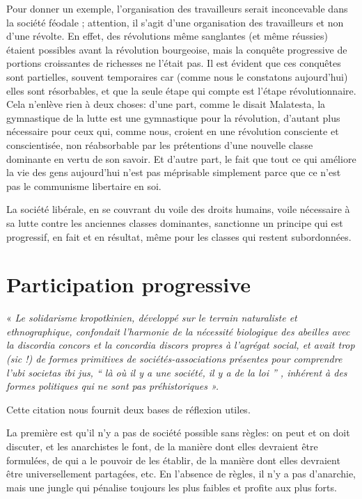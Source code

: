 Pour donner un exemple, l'organisation des travailleurs serait inconcevable dans la société féodale ; attention, il s'agit d'une organisation des travailleurs et non d'une révolte. En effet, des révolutions même sanglantes (et même réussies) étaient possibles avant la révolution bourgeoise, mais la conquête progressive de portions croissantes de richesses ne l'était pas. Il est évident que ces conquêtes sont partielles, souvent temporaires car (comme nous le constatons aujourd'hui) elles sont résorbables, et que la seule étape qui compte est l'étape révolutionnaire. Cela n'enlève rien à deux choses: d'une part, comme le disait Malatesta, la gymnastique de la lutte est une gymnastique pour la révolution, d'autant plus nécessaire pour ceux qui, comme nous, croient en une révolution consciente et conscientisée, non réabsorbable par les prétentions d'une nouvelle classe dominante en vertu de son savoir. Et d'autre part, le fait que tout ce qui améliore la vie des gens aujourd'hui n'est pas méprisable simplement parce que ce n'est pas le communisme libertaire en soi.

La société libérale, en se couvrant du voile des droits humains, voile nécessaire à sa lutte contre les anciennes classes dominantes, sanctionne un principe qui est progressif, en fait et en résultat, même pour les classes qui restent subordonnées.

\section{Participation progressive}

« \emph{Le solidarisme kropotkinien, développé sur le terrain naturaliste et ethnographique, confondait l'harmonie de la nécessité biologique des abeilles avec la discordia concors et la concordia discors propres à l'agrégat social, et avait trop (sic !) de formes primitives de sociétés-associations présentes pour comprendre l'ubi societas ibi jus, “ là où il y a une société, il y a de la loi ” , inhérent à des formes politiques qui ne sont pas préhistoriques ».}

Cette citation nous fournit deux bases de réflexion utiles.

La première est qu'il n'y a pas de société possible sans règles: on peut et on doit discuter, et les anarchistes le font, de la manière dont elles devraient être formulées, de qui a le pouvoir de les établir, de la manière dont elles devraient être universellement partagées, etc. En l'absence de règles, il n'y a pas d'anarchie, mais une jungle qui pénalise toujours les plus faibles et profite aux plus forts.

